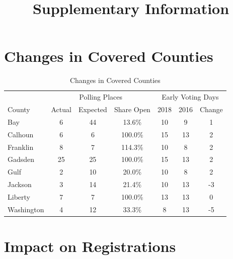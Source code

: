 \documentclass[
  12pt,
]{article}
\title{Supplementary Information}
\author{}
\date{\vspace{-2.5em}}
\begin{document}
\maketitle

{
\setcounter{tocdepth}{2}
\tableofcontents
}
\doublespacing
\setcounter{table}{0}  \renewcommand{\thetable}{A\arabic{table}} \setcounter{figure}{0} \renewcommand{\thefigure}{A\arabic{figure}}

\hypertarget{changes-in-covered-counties}{%
\section*{Changes in Covered Counties}\label{changes-in-covered-counties}}

\begin{singlespace}
\begin{table}[H]

\caption{\label{tab:change-tab}\label{tab:table-changes} Changes in Covered Counties}
\centering
\begin{tabular}[t]{lcccccc}
\toprule
\multicolumn{1}{c}{ } & \multicolumn{3}{c}{Polling Places} & \multicolumn{3}{c}{Early Voting Days} \\
\cmidrule(l{3pt}r{3pt}){2-4} \cmidrule(l{3pt}r{3pt}){5-7}
County & Actual & Expected & Share Open & 2018 & 2016 & Change\\
\midrule
Bay & 6 & 44 & 13.6\% & 10 & 9 & 1\\
Calhoun & 6 & 6 & 100.0\% & 15 & 13 & 2\\
Franklin & 8 & 7 & 114.3\% & 10 & 8 & 2\\
Gadsden & 25 & 25 & 100.0\% & 15 & 13 & 2\\
Gulf & 2 & 10 & 20.0\% & 10 & 8 & 2\\
Jackson & 3 & 14 & 21.4\% & 10 & 13 & -3\\
Liberty & 7 & 7 & 100.0\% & 13 & 13 & 0\\
Washington & 4 & 12 & 33.3\% & 8 & 13 & -5\\
\bottomrule
\end{tabular}
\end{table}
\end{singlespace}

\hypertarget{impact-on-registrations}{%
\section*{Impact on Registrations}\label{impact-on-registrations}}
\end{document}

